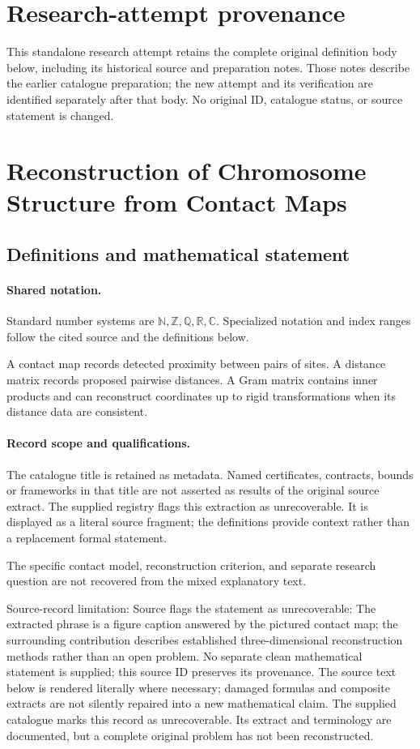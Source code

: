 \documentclass[11pt]{article}
\begin{document}
\section*{Research-attempt provenance}
This standalone research attempt retains the complete original definition body below,
including its historical source and preparation notes. Those notes describe the
earlier catalogue preparation; the new attempt and its verification are identified
separately after that body. No original ID, catalogue status, or source statement is changed.

\section{Reconstruction of Chromosome Structure from Contact Maps}\label{statement}

\subsection{Definitions and mathematical statement}

\paragraph{Shared notation.}Standard number systems are $\mathbb N,\mathbb Z,\mathbb Q,\mathbb R,\mathbb C$. Specialized notation and index ranges follow the cited source and the definitions below.


A contact map records detected proximity between pairs of sites. A distance matrix records proposed pairwise distances. A Gram matrix contains inner products and can reconstruct coordinates up to rigid transformations when its distance data are consistent.
\paragraph{Record scope and qualifications.}
The catalogue title is retained as metadata. Named certificates, contracts, bounds or frameworks in that title are not asserted as results of the original source extract.
The supplied registry flags this extraction as unrecoverable. It is displayed as a literal source fragment; the definitions provide context rather than a replacement formal statement.

The specific contact model, reconstruction criterion, and separate research question are not recovered from the mixed explanatory text.

Source-record limitation: Source flags the statement as unrecoverable: The extracted phrase is a figure caption answered by the pictured contact map; the surrounding contribution describes established three-dimensional reconstruction methods rather than an open problem. No separate clean mathematical statement is supplied; this source ID preserves its provenance.
The source text below is rendered literally where necessary; damaged formulas and composite extracts are not silently repaired into a new mathematical claim.
The supplied catalogue marks this record as unrecoverable. Its extract and terminology are documented, but a complete original problem has not been reconstructed.
\end{document}
